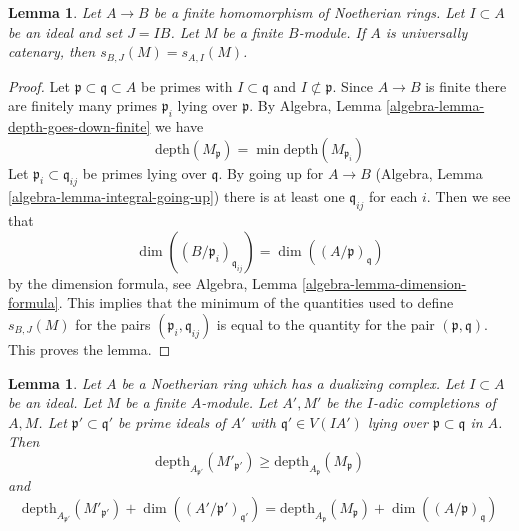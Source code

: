 \documentclass{stacks-project}
\theoremstyle{plain}
\newtheorem{lemma}[subsection]{Lemma}
\theoremstyle{definition}
\theoremstyle{remark}
\numberwithin{equation}{subsection}
\begin{document}
\begin{lemma}
\label{lemma-cutoff}
Let $A \to B$ be a finite homomorphism of Noetherian rings.
Let $I \subset A$ be an ideal and set $J = IB$. Let $M$ be
a finite $B$-module. If $A$ is universally catenary, then
$s_{B, J}(M) = s_{A, I}(M)$.
\end{lemma}

\begin{proof}
Let $\mathfrak p \subset \mathfrak q \subset A$ be primes with
$I \subset \mathfrak q$ and $I \not \subset \mathfrak p$.
Since $A \to B$ is finite there are finitely many primes
$\mathfrak p_i$ lying over $\mathfrak p$. By
Algebra, Lemma \ref{algebra-lemma-depth-goes-down-finite}
we have
$$
\text{depth}(M_\mathfrak p) = \min \text{depth}(M_{\mathfrak p_i})
$$
Let $\mathfrak p_i \subset \mathfrak q_{ij}$ be primes lying
over $\mathfrak q$. By going up for $A \to B$
(Algebra, Lemma \ref{algebra-lemma-integral-going-up})
there is at least one $\mathfrak q_{ij}$ for each $i$.
Then we see that
$$
\dim((B/\mathfrak p_i)_{\mathfrak q_{ij}}) =
\dim((A/\mathfrak p)_\mathfrak q)
$$
by the dimension formula, see
Algebra, Lemma \ref{algebra-lemma-dimension-formula}.
This implies that the minimum of the quantities
used to define $s_{B, J}(M)$
for the pairs $(\mathfrak p_i, \mathfrak q_{ij})$
is equal to the quantity for the pair $(\mathfrak p, \mathfrak q)$.
This proves the lemma.
\end{proof}

\begin{lemma}
\label{lemma-change-completion}
Let $A$ be a Noetherian ring which has a dualizing complex.
Let $I \subset A$ be an ideal.
Let $M$ be a finite $A$-module. Let $A', M'$ be the $I$-adic
completions of $A, M$. Let $\mathfrak p' \subset \mathfrak q'$
be prime ideals of $A'$ with $\mathfrak q' \in V(IA')$
lying over $\mathfrak p \subset \mathfrak q$ in $A$. Then
$$
\text{depth}_{A_{\mathfrak p'}}(M'_{\mathfrak p'})
\geq
\text{depth}_{A_\mathfrak p}(M_\mathfrak p)
$$
and
$$
\text{depth}_{A_{\mathfrak p'}}(M'_{\mathfrak p'}) +
\dim((A'/\mathfrak p')_{\mathfrak q'}) =
\text{depth}_{A_\mathfrak p}(M_\mathfrak p) +
\dim((A/\mathfrak p)_\mathfrak q)
$$
\end{lemma}
\end{document}
